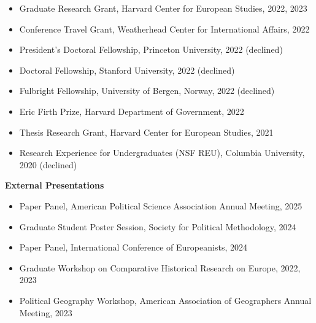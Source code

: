 \documentclass[12pt]{article}
\begin{document}
\begin{footnotesize}
\begin{itemize}[noitemsep,nolistsep]
\item Graduate Research Grant, Harvard Center for European Studies, 2022, 2023

\item Conference Travel Grant, Weatherhead Center for International Affairs, 2022

\item President's Doctoral Fellowship, Princeton University, 2022 (declined)

\item Doctoral Fellowship, Stanford University, 2022 (declined)

\item Fulbright Fellowship, University of Bergen, Norway, 2022 (declined)

\item Eric Firth Prize, Harvard Department of Government, 2022

\item Thesis Research Grant, Harvard Center for European Studies, 2021 

\item Research Experience for Undergraduates (NSF REU), Columbia University, 2020 (declined)

\end{itemize}

\vspace{5mm} 







{\bf {\normalsize External Presentations}}

\vspace{3mm} 

\begin{itemize}[noitemsep,nolistsep]

\item Paper Panel, American Political Science Association Annual Meeting, 2025

\item Graduate Student Poster Session, Society for Political Methodology, 2024

\item Paper Panel, International Conference of Europeanists, 2024

\item Graduate Workshop on Comparative Historical Research on Europe, 2022, 2023

\item Political Geography Workshop, American Association of Geographers Annual Meeting, 2023


\end{itemize}
\end{footnotesize}
\end{document}
